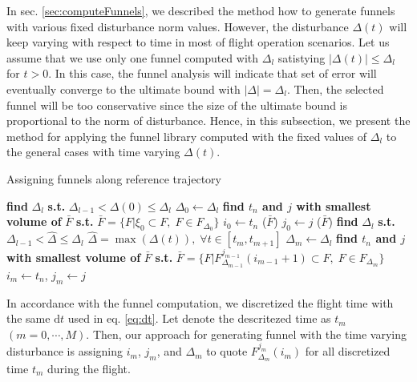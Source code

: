 \documentclass[letterpaper, 10 pt, conference]{ieeeconf}  %
\begin{document}
In sec. \ref{sec:computeFunnels}, we described the method how to generate funnels with various fixed disturbance norm values.
However, the disturbance $\Delta(t)$ will keep varying with respect to time in most of flight operation scenarios.
Let us assume that we use only one funnel computed with $\Delta_l$ satistying $|\Delta(t)| \leq \Delta_l$ for $t>0$.
In this case, the funnel analysis will indicate that set of error will eventually converge to the ultimate bound with $|\Delta| = \Delta_l$. 
Then, the selected funnel will be too conservative since the size of the ultimate bound is proportional to the norm of disturbance.
Hence, in this subsection, we present the method for applying the funnel library computed with the fixed values of $\Delta_l$ to the general cases with time varying $\Delta(t)$. 
\begin{algorithm}[t]
  \caption{Assigning funnels along reference trajectory
    \label{alg:funnel}}
  \begin{algorithmic}[1]
    \Statex
	\State \textbf{find }$\Delta_{l}$\textbf{ s.t.} $\Delta_{l-1} < \Delta(0) \leq \Delta_l$
	\State $\Delta_{0} \gets \Delta_l$
	\State \textbf{find $t_n$ and $j$ with smallest volume of} $\bar{F}$  \textbf{s.t.}
	\State $\bar{F}=\{F|\xi_0 \subset F,\;F\in F_{\Delta_0}\}$
	\State $i_0 \gets t_n$ ($\bar{F}$)
	\State $j_0 \gets j$ ($\bar{F}$)
				\State \textbf{find }$\Delta_l$\textbf{ s.t. } $\Delta_{l-1} < \hat{\Delta} \leq \Delta_l$
				\State {} $\hat{\Delta} = \max(\Delta(t)),\;\forall t\in[t_{m},t_{m+1}]$
				\State $\Delta_{m} \gets \Delta_l$
				\State \textbf{find $t_n$ and $j$ with smallest volume of} $\bar{F}$ \textbf{s.t.}  
				\State $\bar{F}=\{F|F_{\Delta_{m-1}}^{j_{m-1}}(i_{m-1}+1) \subset {F},\;F \in F_{\Delta_m}\}$
				\State $i_m \gets t_n$, $j_m \gets j$
      \EndFor
      \State {}
    \EndFunction
  \end{algorithmic}
\end{algorithm}

In accordance with the funnel computation, we discretized the flight time with the same $\text{d}t$ used in eq. \eqref{eq:dt}.
Let denote the descritezed time as ${t}_m$ $(m = 0,\cdots,M)$.
Then, our approach for generating funnel with the time varying disturbance is assigning $i_m$, $j_m$, and $\Delta_m$ to quote $F_{\Delta_{m}}^{j_m}(i_m)$ for all discretized time $t_m$ during the flight. 
\end{document}
